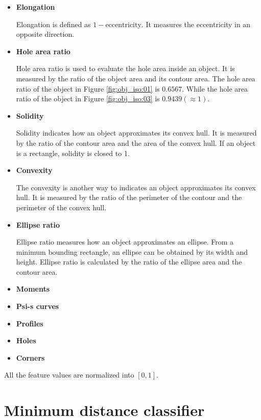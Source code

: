 \documentclass[paper=a4, fontsize=11pt]{scrartcl}
\begin{document}
\begin{itemize}
\item \textbf{Elongation}

Elongation is defined as $ 1 - \mbox{eccentricity} $.
It measures the eccentricity in an opposite direction.

\item \textbf{Hole area ratio}

Hole area ratio is used to evaluate the hole area inside an object.
It is measured by the ratio of the object area and its contour area.
The hole area ratio of the object in Figure \ref{fig:obj_iso:01} is $ 0.6567 $.
While the hole area ratio of the object in Figure \ref{fig:obj_iso:03} is $ 0.9439 ( \approx 1 ) $.

\item \textbf{Solidity}

Solidity indicates how an object approximates its convex hull.
It is measured by the ratio of the contour area and the area of the convex hull.
If an object is a rectangle, solidity is closed to 1.

\item \textbf{Convexity}

The convexity is another way to indicates an object approximates its convex hull.
It is measured by the ratio of the perimeter of the contour and the perimeter of the convex hull.

\item \textbf{Ellipse ratio}

Ellipse ratio measures how an object approximates an ellipse.
From a minimum bounding rectangle, an ellipse can be obtained by its width and height.
Ellipse ratio is calculated by the ratio of the ellipse area and the contour area. 

\item \textbf{Moments}



\item \textbf{Psi-s curves}
\item \textbf{Profiles}
\item \textbf{Holes}
\item \textbf{Corners}
\end{itemize}

All the feature values are normalized into $ [0, 1] $.



\section{Minimum distance classifier}
\label{sec:classifier}
\end{document}
